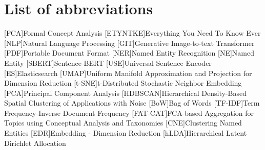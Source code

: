 \section*{List of abbreviations}

\begin{acronym}[XXXXXXXXX]
    [FCA]{Formal Concept Analysis}
    [ETYNTKE]{Everything You Need To Know Ever}
    [NLP]{Natural Language Processing}
    [GIT]{Generative Image-to-text Transformer}
    [PDF]{Portable Document Format}
    [NER]{Named Entity Recognition}
    [NE]{Named Entity}
    [SBERT]{Sentence-BERT}
    [USE]{Universal Sentence Encoder}
    [ES]{Elasticsearch}
    [UMAP]{Uniform Manifold Approximation and Projection for Dimension Reduction}
    [t-SNE]{t-Distributed Stochastic Neighbor Embedding}
    [PCA]{Principal Component Analysis}
    [HDBSCAN]{Hierarchical Density-Based Spatial Clustering of Applications with Noise}
    [BoW]{Bag of Words}
    [TF-IDF]{Term Frequency-Inverse Document Frequency}
    [FAT-CAT]{FCA-based Aggregation for Topics using Conceptual Analysis and Taxonomies}
    [CNE]{Clustering Named Entities}
    [EDR]{Embedding - Dimension Reduction}
    [hLDA]{Hierarchical Latent Dirichlet Allocation}

\end{acronym}